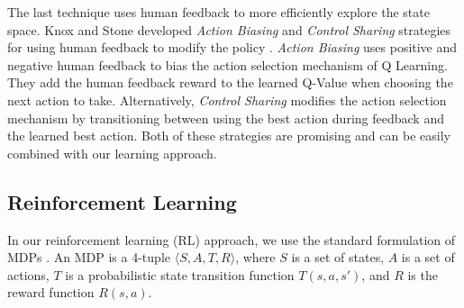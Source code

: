 \documentclass[letterpaper, 10 pt, conference]{ieeeconf}
\begin{document}
The last technique uses human feedback to more efficiently explore the state space. Knox and Stone developed \textit{Action Biasing} and \textit{Control Sharing} strategies for using human feedback to modify the policy \cite{Knox:2012:RLS:2343576.2343644}. \textit{Action Biasing} uses positive and negative human feedback to bias the action selection mechanism of Q Learning. They add the human feedback reward to the learned Q-Value when choosing the next action to take. Alternatively, \textit{Control Sharing} modifies the action selection mechanism by transitioning between using the best action during feedback and the learned best action. Both of these strategies are promising and can be easily combined with our learning approach.  



\subsection{Reinforcement Learning}
In our reinforcement learning (RL) approach, we use the standard formulation of MDPs \cite{Kaelbling:1996:RLS:1622737.1622748}. An MDP is a 4-tuple $\langle S,A,T,R \rangle$, where $S$ is a set of states, $A$ is a set of actions, $T$ is a probabilistic state transition function $T(s,a,s')$, and $R$ is the reward function $R(s,a)$. 
\end{document}
